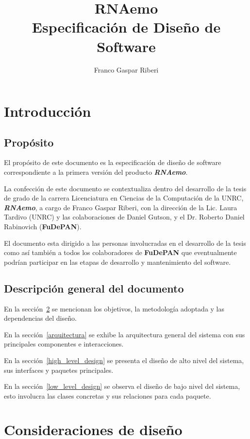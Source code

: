 \documentclass[12pt,a4paper,spanish]{article}
\title{\textbf{RNAemo}\\ \vspace{0.45cm} Especificación de Diseño de Software}
\author{Franco Gaspar Riberi}
\begin{document}
\maketitle\pagebreak{}\tableofcontents{}\pagebreak{}

\newpage

\section{Introducción}
\subsection{Propósito}

El propósito de este documento es la especificación de
diseño de software correspondiente a la primera versión del producto 
\emph{\textbf{RNAemo}}.

La confección de este documento se contextualiza dentro del desarrollo de la tesis
de grado de la carrera Licenciatura en Ciencias de la Computación de la UNRC,
\emph{\textbf{RNAemo}}, a cargo de Franco Gaspar Riberi, con la dirección
de la Lic. Laura Tardivo (UNRC) y las colaboraciones de Daniel
Gutson, y el Dr. Roberto Daniel Rabinovich
(\textbf{FuDePAN}).

El documento esta dirigido a las personas involucradas en el desarrollo de la
tesis como así también a todos los colaboradores de \textbf{FuDePAN} que eventualmente
podrían participar en las etapas de desarrollo y mantenimiento del software.

\subsection{Descripci\'on general del documento}
En la sección~\ref{consideraciones} se mencionan los objetivos, la
metodología adoptada y las dependencias del diseño.

En la sección~\ref{arquitectura} se exhibe la arquitectura general del
sistema con sus principales componentes e interacciones.

En la sección~\ref{high_level_design} se presenta el diseño de alto nivel del sistema,
sus interfaces y paquetes principales.
				    
En la sección~\ref{low_level_design} se observa el diseño de bajo nivel del sistema,
esto involucra las clases concretas y sus relaciones para cada paquete.

\section{Consideraciones de diseño}
\label{consideraciones}
\end{document}

